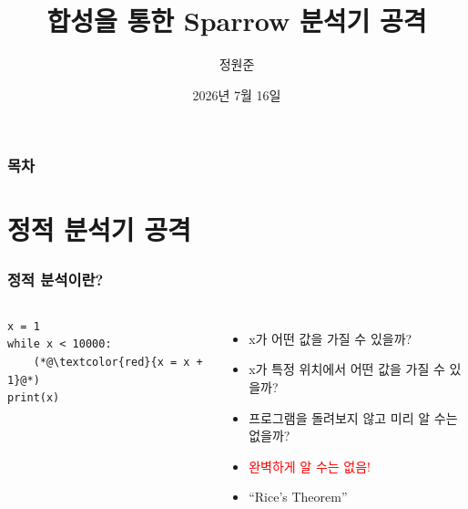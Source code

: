 \documentclass{simplesnt}
\title{\CILmm{} 합성을 통한 Sparrow 분석기 공격}
\author{정원준}
\begin{document}
\date{2026년 7월 16일}
\maketitle


\begin{frame}
  \frametitle{목차}
  \tableofcontents
\end{frame}

\section{정적 분석기 공격}
\begin{frame}[c, fragile]
  \frametitle{정적 분석이란?}

  \setlength{\columnsep}{16pt}

  \begin{columns}[T,onlytextwidth]
    \hfill
    \begin{minipage}{0.78\linewidth}
    \begin{lstlisting}
x = 1
while x < 10000:
    (*@\textcolor{red}{x = x + 1}@*)
print(x)
    \end{lstlisting}
    \end{minipage}

    \vspace{8pt}
    \begin{itemize}
      \item<2-> x가 어떤 값을 가질 수 있을까?
      \item<3-> x가 특정 위치에서 어떤 값을 가질 수 있을까?
      \item<4-> 프로그램을 돌려보지 않고 미리 알 수는 없을까?
      \item<5-> \textcolor{red}{완벽하게 알 수는 없음!}
      \item<6-> ``Rice's Theorem''
    \end{itemize}
  \end{columns}

\end{frame}
\end{document}
